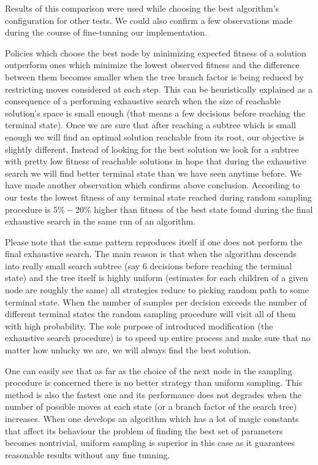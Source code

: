 \begin{figure}[ht]
  \centering
  
\end{figure}

Results of this comparison were used while choosing the best algorithm's
configuration for other tests. We could also confirm a few observations made
during the course of fine-tunning our implementation.

Policies which choose the best node by minimizing expected fitness of a
solution outperform ones which minimize the lowest observed fitness and the
difference between them becomes smaller when the tree branch factor is being
reduced by restricting moves considered at each step. This can be heuristically
explained as a consequence of a performing exhaustive search when the size of
reachable solution's space is small enough (that means a few decisions before
reaching the terminal state). Once we are sure that after reaching a subtree
which is small enough we will find an optimal solution reachable from its root,
our objective is slightly different. Instead of looking for the best solution
we look for a subtree with pretty low fitness of reachable solutions in hope
that during the exhaustive search we will find better terminal state than we
have seen anytime before. We have made another observation which confirms above
conclusion. According to our tests the lowest fitness of any terminal state
reached during random sampling procedure is $5\% - 20\%$ higher than fitness of
the best state found during the final exhaustive search in the same run of an
algorithm.

Please note that the same pattern reproduces itself if one does not perform the
final exhaustive search. The main reason is that when the algorithm descends
into really small search subtree (say $6$ decisions before reaching the
terminal state) and the tree itself is highly uniform (estimates for each
children of a given node are roughly the same) all strategies reduce to picking
random path to some terminal state. When the number of samples per decision
exceeds the number of different terminal states the random sampling procedure
will visit all of them with high probability. The sole purpose of introduced
modification (the exhaustive search procedure) is to speed up entire process
and make sure that no matter how unlucky we are, we will always find the best
solution.

One can easily see that as far as the choice of the next node in the sampling
procedure is concerned there is no better strategy than uniform sampling. This
method is also the fastest one and its performance does not degrades when the
number of possible moves at each state (or a branch factor of the search tree)
increases. When one develops an algorithm which has a lot of magic constants
that affect its behaviour the problem of finding the best set of parameters
becomes nontrivial, uniform sampling is superior in this case as it guarantees
reasonable results without any fine tunning.

